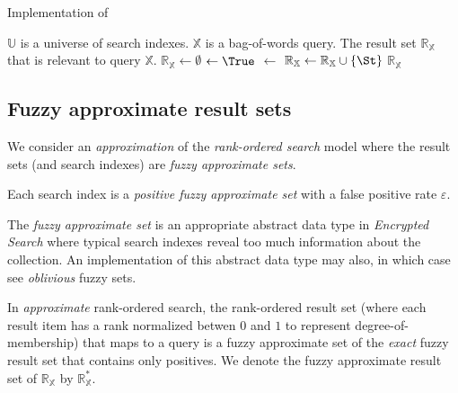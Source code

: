 \documentclass[ ../main.tex]{subfiles}
\begin{document}
\begin{algorithm}[h]
    \caption{Implementation of \protect\BooleanSearch}
    \label{alg:bool_search}
    \Params
    {
        $\mathbb{U}$ is a universe of search indexes.
    }
    \KwIn
    {
        $\mathbb{X}$ is a bag-of-words query.
    }
    \KwOut
    {
        The result set $\mathbb{R}_{\mathbb{X}}$ that is relevant to query $\mathbb{X}$.
    }
    {
        $\mathbb{R}_{\mathbb{X}} \gets \emptyset$\;
        {
             $\gets \True$\;
            {
                {
                     $\gets$ \False\;
                }
            }
            {
                $\mathbb{R}_{\mathbb{X}} \gets \mathbb{R}_{\mathbb{X}} \cup \left\{\St\right\}$\;
            }
        }
        \Return $\mathbb{R}_{\mathbb{X}}$\;
    }
\end{algorithm}

\subsection{Fuzzy approximate result sets}
We consider an \emph{approximation} of the \emph{rank-ordered search} model where the result sets (and search indexes) are \emph{fuzzy approximate sets}.
\begin{assumption}
Each search index is a \emph{positive fuzzy approximate set} with a false positive rate $\varepsilon$.
\end{assumption}
The \emph{fuzzy approximate set} is an appropriate abstract data type in \emph{Encrypted Search}\cite{es} where typical search indexes reveal too much information about the collection. An implementation of this abstract data type may also, in which case see \emph{oblivious} fuzzy sets\cite{}.

In \emph{approximate} rank-ordered search, the rank-ordered result set (where each result item has a rank normalized betwen $0$ and $1$ to represent degree-of-membership) that maps to a query is a fuzzy approximate set of the \emph{exact} fuzzy result set that contains only positives. We denote the fuzzy approximate result set of $\mathbb{R}_{\mathbb{X}}$ by $\mathbb{R}_{\mathbb{X}}^*$.
\end{document}
